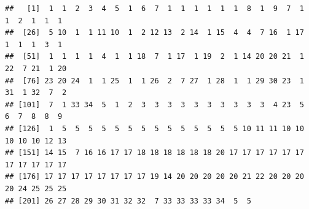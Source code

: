 \documentclass[
]{article}
\newenvironment{Shaded}{\begin{snugshade}}{\end{snugshade}}
\newcommand{\AttributeTok}[1]{\textcolor[rgb]{0.77,0.63,0.00}{#1}}
\newcommand{\CommentTok}[1]{\textcolor[rgb]{0.56,0.35,0.01}{\textit{#1}}}
\newcommand{\ConstantTok}[1]{\textcolor[rgb]{0.00,0.00,0.00}{#1}}
\newcommand{\ControlFlowTok}[1]{\textcolor[rgb]{0.13,0.29,0.53}{\textbf{#1}}}
\newcommand{\DocumentationTok}[1]{\textcolor[rgb]{0.56,0.35,0.01}{\textbf{\textit{#1}}}}
\newcommand{\FunctionTok}[1]{\textcolor[rgb]{0.00,0.00,0.00}{#1}}
\newcommand{\NormalTok}[1]{#1}
\newcommand{\OtherTok}[1]{\textcolor[rgb]{0.56,0.35,0.01}{#1}}
\newcommand{\SpecialCharTok}[1]{\textcolor[rgb]{0.00,0.00,0.00}{#1}}
\begin{document}
\begin{Shaded}
\end{Shaded}

\begin{verbatim}
##   [1]  1  1  2  3  4  5  1  6  7  1  1  1  1  1  1  8  1  9  7  1  1  2  1  1  1
##  [26]  5 10  1  1 11 10  1  2 12 13  2 14  1 15  4  4  7 16  1 17  1  1  1  3  1
##  [51]  1  1  1  1  4  1  1 18  7  1 17  1 19  2  1 14 20 20 21  1 22  7 21  1 20
##  [76] 23 20 24  1  1 25  1  1 26  2  7 27  1 28  1  1 29 30 23  1 31  1 32  7  2
## [101]  7  1 33 34  5  1  2  3  3  3  3  3  3  3  3  3  3  4 23  5  6  7  8  8  9
## [126]  1  5  5  5  5  5  5  5  5  5  5  5  5  5  5 10 11 11 10 10 10 10 10 12 13
## [151] 14 15  7 16 16 17 17 18 18 18 18 18 18 20 17 17 17 17 17 17 17 17 17 17 17
## [176] 17 17 17 17 17 17 17 17 19 14 20 20 20 20 20 21 22 20 20 20 20 24 25 25 25
## [201] 26 27 28 29 30 31 32 32  7 33 33 33 33 34  5  5
\end{verbatim}

\begin{Shaded}
\end{Shaded}
\end{document}
